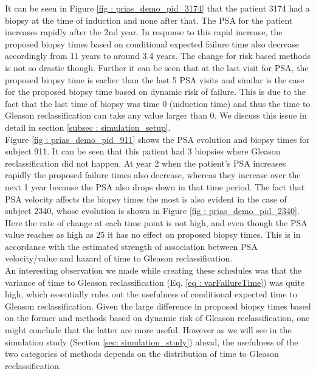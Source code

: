 It can be seen in Figure \ref{fig : prias_demo_pid_3174} that the patient 3174 had a biopsy at the time of induction and none after that. The PSA for the patient increases rapidly after the 2nd year. In response to this rapid increase, the proposed biopsy times based on conditional expected failure time also decrease accordingly from 11 years to around 3.4 years. The change for risk based methods is not so drastic though. Further it can be seen that at the last visit for PSA, the proposed biopsy time is earlier than the last 5 PSA visits and similar is the case for the proposed biopsy time based on dynamic risk of failure. This is due to the fact that the last time of biopsy was time 0 (induction time) and thus the time to Gleason reclassification can take any value larger than 0. We discuss this issue in detail in section \ref{subsec : simulation_setup}.\\

Figure \ref{fig : prias_demo_pid_911} shows the PSA evolution and biopsy times for subject 911. It can be seen that this patient had 3 biopsies where Gleason reclassification did not happen. At year 2 when the patient's PSA increases rapidly the proposed failure times also decrease, whereas they increase over the next 1 year because the PSA also drops down in that time period. The fact that PSA velocity affects the biopsy times the most is also evident in the case of subject 2340, whose evolution is shown in Figure \ref{fig : prias_demo_pid_2340}. Here the rate of change at each time point is not high, and even though the PSA value reaches as high as 25 it has no effect on proposed biopsy times. This is in accordance with the estimated strength of association between PSA velocity/value and hazard of time to Gleason reclassification.\\

An interesting observation we made while creating these schedules was that the variance of time to Gleason reclassification (Eq. \ref{eq : varFailureTime}) was quite high, which essentially rules out the usefulness of conditional expected time to Gleason reclassification. Given the large difference in proposed biopsy times based on the former and methods based on dynamic risk of Gleason reclassification, one might conclude that the latter are more useful. However as we will see in the simulation study (Section \ref{sec: simulation_study}) ahead, the usefulness of the two categories of methods depends on the distribution of time to Gleason reclassification.
